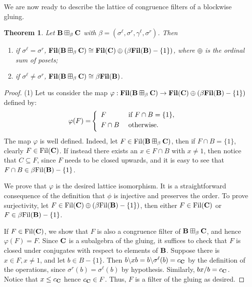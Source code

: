 \documentclass{amsart}
\newtheorem{theorem}{Theorem}[section]
\theoremstyle{definition}
\numberwithin{equation}{section}
\newcommand{\alg}[1]{{\textbf{\upshape #1}}}  %
\newcommand{\sell}{\sigma^\ell}
\newcommand{\sr}{\sigma^r}
\newcommand{\gell}{\gamma^\ell}
\newcommand{\fil}{\mathbf{Fil}}
\newcommand{\dfil}{{\rm Fil}}
\newcommand{\betafil}{\mathbf{\beta Fil}}
\newcommand{\dbetafil}{{\rm \beta Fil}}
\begin{document}
We are now ready to describe the lattice of congruence filters of a blockwise gluing. 
\begin{theorem}\label{theorem: description of filters}
	Let $\alg B \boxplus_\beta \alg C$ with $\beta=(\sell, \sr, \gell, \sr)$. Then 
	\begin{enumerate}
		\item if $\sell=\sr$, $\fil(\alg B \boxplus_\beta \alg C)\cong \fil(\alg C) \oplus (\betafil(\alg B) -\{1\})$, where $\oplus$ is the ordinal sum of posets;
		\item if $\sell \neq \sr$, $\fil(\alg B \boxplus_\beta \alg C)\cong\betafil(\alg B)$.
	\end{enumerate}
\end{theorem}
\begin{proof}
	(1)  Let us consider the map $\varphi: \fil(\alg B \boxplus_\beta \alg C) \to \fil(\alg C) \oplus (\betafil(\alg B)-\{1\})$ defined by:
\begin{align*}
	\varphi(F) = &\left\{\begin{array}{l l}
F &\mbox{ if } F \cap B = \{1\}, \vspace{0.1cm}\\
F \cap B &\mbox{ otherwise.} \vspace{0.1cm}
\end{array}\right.
\end{align*}
The map $\varphi$ is well defined. Indeed, let $F \in \dfil(\alg B \boxplus_\beta \alg C)$, then if $F \cap B = \{1\}$, clearly $F \in \dfil(\alg C)$. 
	  If instead there exists an $ x \in F \cap  B$ with $x \neq 1$, then notice that $C \subseteq F$, since $F$ needs to be closed upwards, and it is easy to see that $F \cap  B \in \dbetafil(\alg B)-\{1\}$. 
	  
	  We prove that $\varphi$ is the desired lattice isomorphism. It is a straightforward consequence of the definition that $\phi$ is injective and preserves the order. To prove surjectivity, let $F \in \dfil(\alg C) \oplus (\dbetafil(\alg B)-\{1\})$, then either $F \in \dfil(\alg C)$ or $F \in \dbetafil(\alg B)-\{1\}$. 
	  
	  If $F \in \dfil(\alg C)$, we show that $F$ is also a congruence filter of $\alg B \boxplus_\beta \alg C$, and hence $\varphi(F) = F$. Since $\alg C$ is a subalgebra of the gluing, it suffices to check that $F$ is closed under conjugates with respect to elements of $\alg B$. Suppose there is $x \in F, x \neq 1$, and let $b \in B-\{1\}$. Then $b \backslash xb = b \backslash \sell(b) = c_{\alg C}$ by the definition of the operations, since $\sr(b) = \sell(b)$ by hypothesis. Similarly, $bx/b = c_{\alg C}$. Notice that $x \leq c_{\alg C}$ hence $c_{\alg C} \in F$. Thus, $F$ is a filter of the gluing as desired. 
	  

\end{proof}
\end{document}
